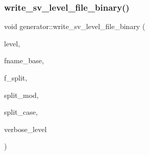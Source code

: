 \mbox{\label{classgenerator_ae182254fd2172f14e69dabfd3c63ccdf}} 
\subsubsection{\texorpdfstring{write\+\_\+sv\+\_\+level\+\_\+file\+\_\+binary()}{write\_sv\_level\_file\_binary()}}
{\footnotesize\ttfamily void generator\+::write\+\_\+sv\+\_\+level\+\_\+file\+\_\+binary (\begin{DoxyParamCaption}\item[{\mbox{\hyperlink{galois_8h_a09fddde158a3a20bd2dcadb609de11dc}{I\+NT}}}]{level,  }\item[{\mbox{\hyperlink{galois_8h_ab6cc7b4aeb6ea31aba2b3fbfc83ff5e6}{B\+Y\+TE}} $\ast$}]{fname\+\_\+base,  }\item[{\mbox{\hyperlink{galois_8h_a09fddde158a3a20bd2dcadb609de11dc}{I\+NT}}}]{f\+\_\+split,  }\item[{\mbox{\hyperlink{galois_8h_a09fddde158a3a20bd2dcadb609de11dc}{I\+NT}}}]{split\+\_\+mod,  }\item[{\mbox{\hyperlink{galois_8h_a09fddde158a3a20bd2dcadb609de11dc}{I\+NT}}}]{split\+\_\+case,  }\item[{\mbox{\hyperlink{galois_8h_a09fddde158a3a20bd2dcadb609de11dc}{I\+NT}}}]{verbose\+\_\+level }\end{DoxyParamCaption})}

\mbox{\label{classgenerator_aee3610f6c181222f40c5ea0ad941ec2c}} 
